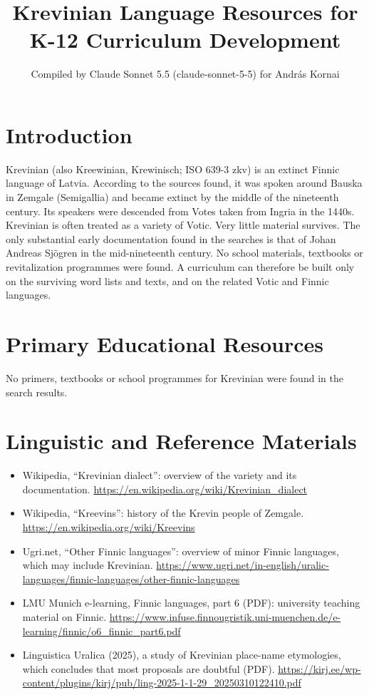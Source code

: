 \documentclass[12pt]{article}
\title{Krevinian Language Resources for K-12 Curriculum Development}
\author{Compiled by Claude Sonnet 5.5 (claude-sonnet-5-5) for Andr\'as Kornai}
\date{}
\begin{document}
\maketitle

\section{Introduction}
Krevinian (also Kreewinian, Krewinisch; ISO 639-3 zkv) is an extinct Finnic language of Latvia. According to the sources found, it was spoken around Bauska in Zemgale (Semigallia) and became extinct by the middle of the nineteenth century. Its speakers were descended from Votes taken from Ingria in the 1440s. Krevinian is often treated as a variety of Votic. Very little material survives. The only substantial early documentation found in the searches is that of Johan Andreas Sj\"ogren in the mid-nineteenth century. No school materials, textbooks or revitalization programmes were found. A curriculum can therefore be built only on the surviving word lists and texts, and on the related Votic and Finnic languages.

\section{Primary Educational Resources}
No primers, textbooks or school programmes for Krevinian were found in the search results.

\section{Linguistic and Reference Materials}
\begin{itemize}
\item Wikipedia, ``Krevinian dialect'': overview of the variety and its documentation. \url{https://en.wikipedia.org/wiki/Krevinian_dialect}
\item Wikipedia, ``Kreevins'': history of the Krevin people of Zemgale. \url{https://en.wikipedia.org/wiki/Kreevins}
\item Ugri.net, ``Other Finnic languages'': overview of minor Finnic languages, which may include Krevinian. \url{https://www.ugri.net/in-english/uralic-languages/finnic-languages/other-finnic-languages}
\item LMU Munich e-learning, Finnic languages, part 6 (PDF): university teaching material on Finnic. \url{https://www.infuse.finnougristik.uni-muenchen.de/e-learning/finnic/o6_finnic_part6.pdf}
\item Linguistica Uralica (2025), a study of Krevinian place-name etymologies, which concludes that most proposals are doubtful (PDF). \url{https://kirj.ee/wp-content/plugins/kirj/pub/ling-2025-1-1-29_20250310122410.pdf}
\end{itemize}
\end{document}
